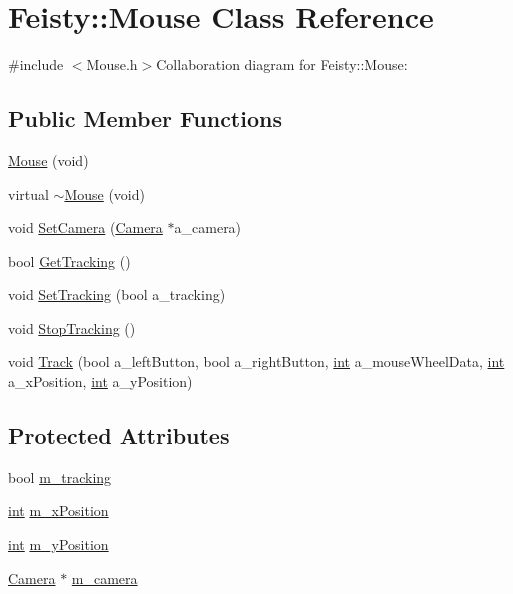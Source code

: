\hypertarget{class_feisty_1_1_mouse}{
\section{Feisty::Mouse Class Reference}
\label{class_feisty_1_1_mouse}
}


{\ttfamily \#include $<$Mouse.h$>$}Collaboration diagram for Feisty::Mouse:\subsection*{Public Member Functions}
\begin{DoxyCompactItemize}
\item 
\hyperlink{class_feisty_1_1_mouse_a818302ae6bc41be0490553fd1541b997}{Mouse} (void)
\item 
virtual \hyperlink{class_feisty_1_1_mouse_a287d4659d1b5198d8ea6e18723174dda}{$\sim$Mouse} (void)
\item 
void \hyperlink{class_feisty_1_1_mouse_ad6a62deee38522a55f0a5ac4c4c29e5f}{SetCamera} (\hyperlink{class_feisty_1_1_camera}{Camera} $\ast$a\_\-camera)
\item 
bool \hyperlink{class_feisty_1_1_mouse_ace89c4a2ec21bf4fcac54ac17bf7cc39}{GetTracking} ()
\item 
void \hyperlink{class_feisty_1_1_mouse_a234f0e6ed4ea60f8018fd147a5cfe3dc}{SetTracking} (bool a\_\-tracking)
\item 
void \hyperlink{class_feisty_1_1_mouse_adf5f8bcd509c14193e883e7709ec6dd9}{StopTracking} ()
\item 
void \hyperlink{class_feisty_1_1_mouse_ab70372e63d02a6a781b00bd46e7ccca7}{Track} (bool a\_\-leftButton, bool a\_\-rightButton, \hyperlink{_d_x_u_tgui_8cpp_a2d77ed03302b6978834ee3b6f57837fb}{int} a\_\-mouseWheelData, \hyperlink{_d_x_u_tgui_8cpp_a2d77ed03302b6978834ee3b6f57837fb}{int} a\_\-xPosition, \hyperlink{_d_x_u_tgui_8cpp_a2d77ed03302b6978834ee3b6f57837fb}{int} a\_\-yPosition)
\end{DoxyCompactItemize}
\subsection*{Protected Attributes}
\begin{DoxyCompactItemize}
\item 
bool \hyperlink{class_feisty_1_1_mouse_a27b4fe989daff9bd9ff031b485a5f51a}{m\_\-tracking}
\item 
\hyperlink{_d_x_u_tgui_8cpp_a2d77ed03302b6978834ee3b6f57837fb}{int} \hyperlink{class_feisty_1_1_mouse_a57c3e21679268866baf51dc697ea682a}{m\_\-xPosition}
\item 
\hyperlink{_d_x_u_tgui_8cpp_a2d77ed03302b6978834ee3b6f57837fb}{int} \hyperlink{class_feisty_1_1_mouse_ac066192462fc496bd68f47c5bcfee6e4}{m\_\-yPosition}
\item 
\hyperlink{class_feisty_1_1_camera}{Camera} $\ast$ \hyperlink{class_feisty_1_1_mouse_a144e77580d9067ccb09a401fea5c60f2}{m\_\-camera}
\end{DoxyCompactItemize}


